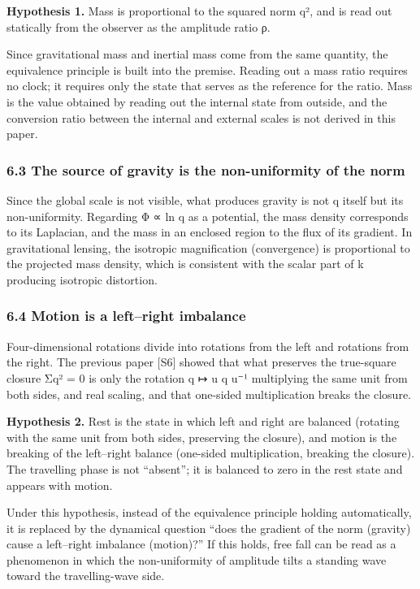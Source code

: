 \documentclass[
  a4paper,
]{article}
\begin{document}
\textbf{Hypothesis 1.} Mass is proportional to the squared norm
\textbar q\textbar², and is read out statically from the observer as the
amplitude ratio ρ.

Since gravitational mass and inertial mass come from the same quantity,
the equivalence principle is built into the premise. Reading out a mass
ratio requires no clock; it requires only the state that serves as the
reference for the ratio. Mass is the value obtained by reading out the
internal state from outside, and the conversion ratio between the
internal and external scales is not derived in this paper.

\subsubsection{6.3 The source of gravity is the non-uniformity of the
norm}\label{the-source-of-gravity-is-the-non-uniformity-of-the-norm}

Since the global scale is not visible, what produces gravity is not
\textbar q\textbar{} itself but its non-uniformity. Regarding Φ ∝ ln
\textbar q\textbar{} as a potential, the mass density corresponds to its
Laplacian, and the mass in an enclosed region to the flux of its
gradient. In gravitational lensing, the isotropic magnification
(convergence) is proportional to the projected mass density, which is
consistent with the scalar part of k producing isotropic distortion.

\subsubsection{6.4 Motion is a left--right
imbalance}\label{motion-is-a-leftright-imbalance}

Four-dimensional rotations divide into rotations from the left and
rotations from the right. The previous paper {[}S6{]} showed that what
preserves the true-square closure Σq² = 0 is only the rotation q ↦ u q
u⁻¹ multiplying the same unit from both sides, and real scaling, and
that one-sided multiplication breaks the closure.

\textbf{Hypothesis 2.} Rest is the state in which left and right are
balanced (rotating with the same unit from both sides, preserving the
closure), and motion is the breaking of the left--right balance
(one-sided multiplication, breaking the closure). The travelling phase
is not ``absent''; it is balanced to zero in the rest state and appears
with motion.

Under this hypothesis, instead of the equivalence principle holding
automatically, it is replaced by the dynamical question ``does the
gradient of the norm (gravity) cause a left--right imbalance (motion)?''
If this holds, free fall can be read as a phenomenon in which the
non-uniformity of amplitude tilts a standing wave toward the
travelling-wave side.
\end{document}
